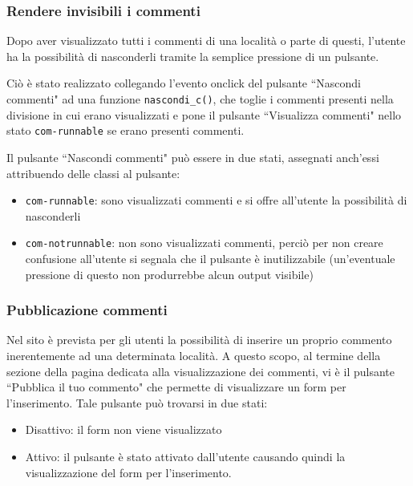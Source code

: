 \subsubsection{Rendere invisibili i commenti}
Dopo aver visualizzato tutti i commenti di una località o parte di questi,
l'utente ha la possibilità di nasconderli tramite la semplice pressione di un
pulsante.

Ciò è stato realizzato collegando l'evento onclick del pulsante
``Nascondi commenti" ad una funzione \texttt{nascondi\_c()}, che toglie i
commenti presenti nella divisione in cui erano visualizzati e pone il pulsante
``Visualizza commenti" nello stato \texttt{com-runnable} se erano presenti
commenti.

Il pulsante ``Nascondi commenti" può essere in due stati, assegnati anch'essi
attribuendo delle classi al pulsante:
\begin{itemize}
\item \texttt{com-runnable}: sono visualizzati commenti e si offre all'utente
la possibilità di nasconderli
\item \texttt{com-notrunnable}: non sono visualizzati commenti, perciò per non
creare confusione all'utente si segnala che il pulsante è inutilizzabile
(un'eventuale pressione di questo non produrrebbe alcun output visibile)
\end{itemize}


\subsubsection{Pubblicazione commenti}
Nel sito è prevista per gli utenti la possibilità di inserire un proprio commento
inerentemente ad una determinata località. A questo scopo, al termine della sezione 
della pagina dedicata alla visualizzazione dei commenti, vi è il pulsante 
``Pubblica il tuo commento" che permette di visualizzare un form per l'inserimento. 
Tale pulsante può trovarsi in due stati:
\begin{itemize}
\item Disattivo: il form non viene visualizzato
\item Attivo: il pulsante è stato attivato dall'utente causando
quindi la visualizzazione del form per l'inserimento.
\end{itemize}

